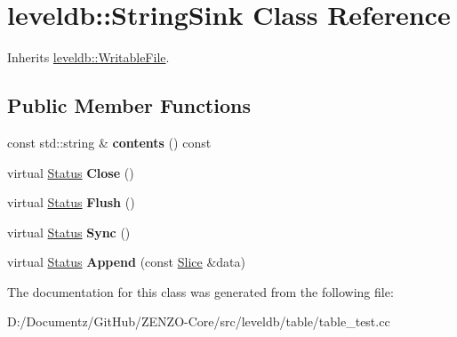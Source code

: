 \hypertarget{classleveldb_1_1_string_sink}{}\section{leveldb\+::String\+Sink Class Reference}
\label{classleveldb_1_1_string_sink}


Inherits \mbox{\hyperlink{classleveldb_1_1_writable_file}{leveldb\+::\+Writable\+File}}.

\subsection*{Public Member Functions}
\begin{DoxyCompactItemize}
\item 
\mbox{\label{classleveldb_1_1_string_sink_aef5436853b707a7d2ddc491cbdbf33ef}} 
const std\+::string \& {\bfseries contents} () const
\item 
\mbox{\label{classleveldb_1_1_string_sink_a40e2142f8078720ecbad8a1d48be6f48}} 
virtual \mbox{\hyperlink{classleveldb_1_1_status}{Status}} {\bfseries Close} ()
\item 
\mbox{\label{classleveldb_1_1_string_sink_af8dc901a44e89b56726bde2782a41ab7}} 
virtual \mbox{\hyperlink{classleveldb_1_1_status}{Status}} {\bfseries Flush} ()
\item 
\mbox{\label{classleveldb_1_1_string_sink_a77f1f2b9797737fbd89211ba0bb9a93e}} 
virtual \mbox{\hyperlink{classleveldb_1_1_status}{Status}} {\bfseries Sync} ()
\item 
\mbox{\label{classleveldb_1_1_string_sink_a10db68412947f16bde307677a663c241}} 
virtual \mbox{\hyperlink{classleveldb_1_1_status}{Status}} {\bfseries Append} (const \mbox{\hyperlink{classleveldb_1_1_slice}{Slice}} \&data)
\end{DoxyCompactItemize}


The documentation for this class was generated from the following file\+:\begin{DoxyCompactItemize}
\item 
D\+:/\+Documentz/\+Git\+Hub/\+Z\+E\+N\+Z\+O-\/\+Core/src/leveldb/table/table\+\_\+test.\+cc\end{DoxyCompactItemize}
